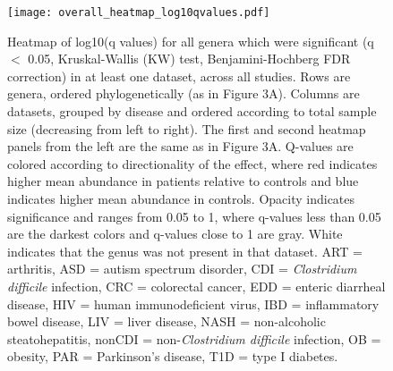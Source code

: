 {\begin{figure}[h]
	\begin{center}
	\texttt{[image: overall\_heatmap\_log10qvalues.pdf]}
	\caption{Heatmap of log10(q values) for all genera which were significant (q $<$ 0.05, Kruskal-Wallis (KW) test, Benjamini-Hochberg FDR correction) in at least one dataset, across all studies. Rows are genera, ordered phylogenetically (as in Figure 3A). Columns are datasets, grouped by disease and ordered according to total sample size (decreasing from left to right). The first and second heatmap panels from the left are the same as in Figure 3A. Q-values are colored according to directionality of the effect, where red indicates higher mean abundance in patients relative to controls and blue indicates higher mean abundance in controls. Opacity indicates significance and ranges from 0.05 to 1, where q-values less than 0.05 are the darkest colors and q-values close to 1 are gray. White indicates that the genus was not present in that dataset. ART = arthritis, ASD = autism spectrum disorder, CDI = \textit{Clostridium difficile} infection, CRC = colorectal cancer, EDD = enteric diarrheal disease, HIV = human immunodeficient virus, IBD = inflammatory bowel disease, LIV = liver disease, NASH = non-alcoholic steatohepatitis, nonCDI = non-\textit{Clostridium difficile} infection, OB = obesity, PAR = Parkinson's disease, T1D = type I diabetes.
}
	\label{fig:overall_heatmap_qvalues}
	\end{center}
\end{figure}

}
